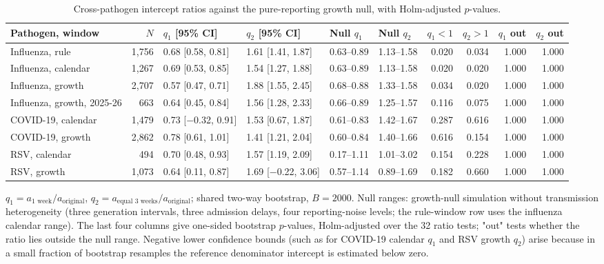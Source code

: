 \begin{table}[htbp]
\centering
\footnotesize
\caption{Cross-pathogen intercept ratios against the pure-reporting growth null, with Holm-adjusted $p$-values.}
\label{tab:s6}
\begin{tabular}{lrllllrrrr}
\toprule
Pathogen, window & $N$ & $q_1$ [95\% CI] & $q_2$ [95\% CI] & Null $q_1$ & Null $q_2$ & $q_1<1$ & $q_2>1$ & $q_1$ out & $q_2$ out \\
\midrule
Influenza, rule & 1{,}756 & 0.68 [0.58, 0.81] & 1.61 [1.41, 1.87] & 0.63--0.89 & 1.13--1.58 & 0.020 & 0.034 & 1.000 & 1.000 \\
Influenza, calendar & 1{,}267 & 0.69 [0.53, 0.85] & 1.54 [1.27, 1.88] & 0.63--0.89 & 1.13--1.58 & 0.020 & 0.020 & 1.000 & 1.000 \\
Influenza, growth & 2{,}707 & 0.57 [0.47, 0.71] & 1.88 [1.55, 2.45] & 0.68--0.88 & 1.33--1.58 & 0.034 & 0.020 & 1.000 & 1.000 \\
Influenza, growth, 2025-26 & 663 & 0.64 [0.45, 0.84] & 1.56 [1.28, 2.33] & 0.66--0.89 & 1.25--1.57 & 0.116 & 0.075 & 1.000 & 1.000 \\
COVID-19, calendar & 1{,}479 & 0.73 [$-$0.32, 0.91] & 1.53 [0.67, 1.87] & 0.61--0.83 & 1.42--1.67 & 0.287 & 0.616 & 1.000 & 1.000 \\
COVID-19, growth & 2{,}862 & 0.78 [0.61, 1.01] & 1.41 [1.21, 2.04] & 0.60--0.84 & 1.40--1.66 & 0.616 & 0.154 & 1.000 & 1.000 \\
RSV, calendar & 494 & 0.70 [0.48, 0.93] & 1.57 [1.19, 2.09] & 0.17--1.11 & 1.01--3.02 & 0.154 & 0.228 & 1.000 & 1.000 \\
RSV, growth & 1{,}073 & 0.64 [0.11, 0.87] & 1.69 [$-$0.22, 3.06] & 0.57--1.14 & 0.89--1.69 & 0.182 & 0.660 & 1.000 & 1.000 \\
\bottomrule
\end{tabular}
\par\smallskip
\begin{minipage}{0.95\linewidth}\scriptsize $q_1=a_{\text{1 week}}/a_{\text{original}}$, $q_2=a_{\text{equal 3 weeks}}/a_{\text{original}}$; shared two-way bootstrap, $B=2000$. Null ranges: growth-null simulation without transmission heterogeneity (three generation intervals, three admission delays, four reporting-noise levels; the rule-window row uses the influenza calendar range). The last four columns give one-sided bootstrap $p$-values, Holm-adjusted over the 32 ratio tests; "out" tests whether the ratio lies outside the null range. Negative lower confidence bounds (such as for COVID-19 calendar $q_1$ and RSV growth $q_2$) arise because in a small fraction of bootstrap resamples the reference denominator intercept is estimated below zero.\end{minipage}
\end{table}
